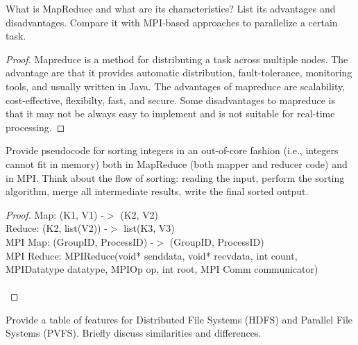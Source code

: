 \documentclass[12pt]{article}
\newenvironment{exercise}[2][Exercise]{\begin{trivlist}
\item[\hskip \labelsep {\bfseries #1}\hskip \labelsep {\bfseries #2.}]}{\end{trivlist}}
\begin{document}
\begin{exercise}{7}
What is MapReduce and what are its characteristics? List its advantages and disadvantages. Compare it with MPI-based approaches to parallelize a certain task. 
\end{exercise}

\begin{proof}
Mapreduce is a method for distributing a task across  multiple nodes. The advantage are that it provides automatic distribution, fault-tolerance, monitoring tools, and usually written in Java.
The advantages of mapreduce are scalability, cost-effective, flexibilty, fast, and secure. Some disadvantages to mapreduce is that it may not be always easy to implement and is not suitable for real-time processing. 
\end{proof}

\begin{exercise}{8}
Provide pseudocode for sorting integers in an out-of-core fashion (i.e., integers cannot fit in memory) both in MapReduce (both mapper and reducer code) and in MPI. Think about the flow of sorting: reading the input, perform the sorting algorithm, merge all intermediate results, write the final sorted output.
\end{exercise}

\begin{proof}
Map: (K1, V1) -$>$ (K2, V2) \\ 
Reduce: (K2, list(V2)) -$>$ list(K3, V3) \\ 
MPI Map: (GroupID, ProcessID) -$>$ (GroupID, ProcessID) \\ 
MPI Reduce: MPIReduce(void* senddata, void* recvdata, int count, MPIDatatype datatype, MPIOp op, int root, MPI Comm communicator) \\ \\


\end{proof}

\begin{exercise}{9}
Provide a table of features for Distributed File Systems (HDFS) and Parallel File Systems (PVFS). Briefly discuss similarities and differences. 
\end{exercise}
\end{document}
